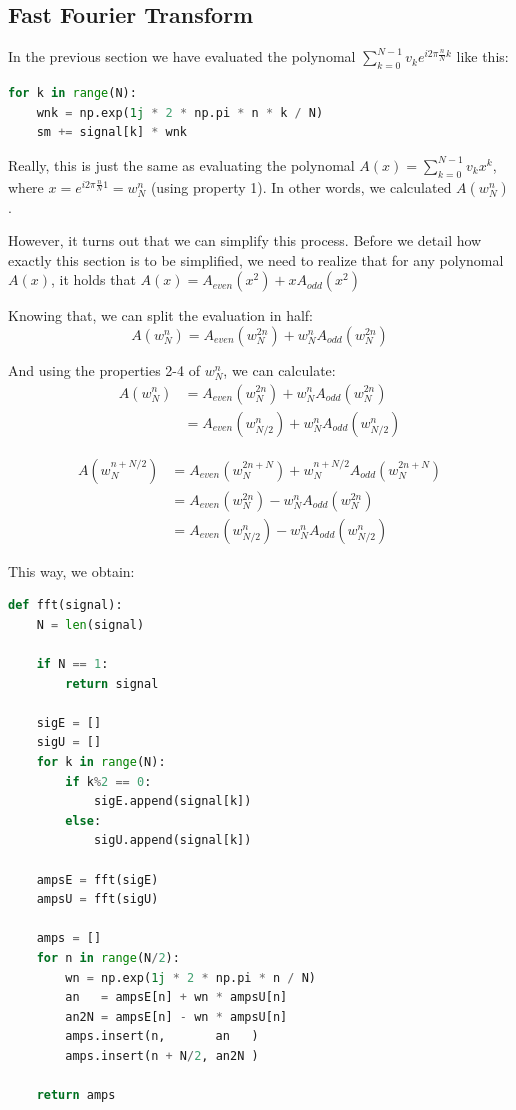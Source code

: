 \subsection{Fast Fourier Transform}

In the previous section we have evaluated the polynomal $\sum_{k=0}^{N-1} v_k e^{i 2 \pi \frac{n}{N} k}$ like this:
\begin{lstlisting}[language=python]
for k in range(N):
    wnk = np.exp(1j * 2 * np.pi * n * k / N) 
    sm += signal[k] * wnk
\end{lstlisting}

Really, this is just the same as evaluating the polynomal $A(x) = \sum_{k=0}^{N-1} v_k x^k$, where $x = e^{i 2 \pi \frac{n}{N} 1} = w_N^n$ (using property 1). In other words, we calculated $A(w_N^n)$.

However, it turns out that we can simplify this process. Before we detail how exactly this section is to be simplified, we need to realize that for any polynomal $A(x)$, it holds that $A(x) = A_{even}(x^2) + x A_{odd}(x^2)$


Knowing that, we can split the evaluation in half:
$$ A(w_N^n) = A_{even}(w_N^{2n}) + w_N^n A_{odd}(w_N^{2n})$$


And using the properties 2-4 of $w_N^n$, we can calculate:
\begin{equation} 
\begin{split} 
    A(w_N^n) & = A_{even}(w_N^{2n})   + w_N^n A_{odd}(w_N^{2n})   \\
             & = A_{even}(w_{N/2}^n)  + w_N^n A_{odd}(w_{N/2}^n)
\end{split}
\end{equation}

\begin{equation} 
\begin{split}  
A(w_N^{n + N/2})  & = A_{even}(w_N^{2n+ N}) + w_N^{n+N/2} A_{odd}(w_N^{2n + N}) \\
                  & = A_{even}(w_N^{2n}) - w_N^n A_{odd}(w_N^{2n})   \\
                  & = A_{even}(w_{N/2}^n) - w_N^n A_{odd}(w_{N/2}^n)
\end{split}
\end{equation}

This way, we obtain:
\begin{lstlisting}[language=python]
def fft(signal):
    N = len(signal)

    if N == 1:
        return signal

    sigE = []
    sigU = []
    for k in range(N):
        if k%2 == 0:
            sigE.append(signal[k])
        else:
            sigU.append(signal[k])

    ampsE = fft(sigE)
    ampsU = fft(sigU)

    amps = []
    for n in range(N/2):
        wn = np.exp(1j * 2 * np.pi * n / N)
        an   = ampsE[n] + wn * ampsU[n]
        an2N = ampsE[n] - wn * ampsU[n]
        amps.insert(n,       an   )
        amps.insert(n + N/2, an2N )

    return amps
\end{lstlisting}

